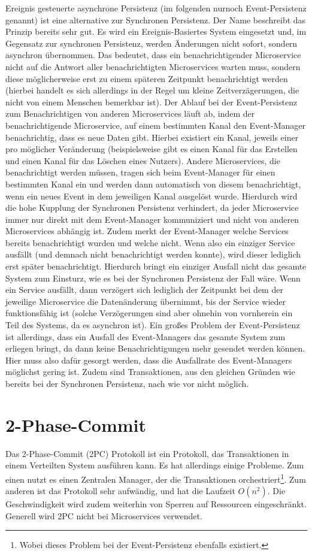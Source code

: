 Ereignis gesteuerte asynchrone Persistenz (im folgenden nurnoch Event-Persistenz genannt) ist eine alternative zur Synchronen Persistenz. Der Name beschreibt das Prinzip bereits sehr gut. Es wird ein Ereignis-Basiertes System eingesetzt und, im Gegensatz zur synchronen Persistenz, werden Änderungen nicht sofort, sondern asynchron übernommen. Das bedeutet, dass ein benachrichtigender Microservice nicht auf die Antwort aller benachrichtigten Microservices warten muss, sondern diese möglicherweise erst zu einem späteren Zeitpunkt benachrichtigt werden (hierbei handelt es sich allerdings in der Regel um kleine Zeitverzägerungen, die nicht von einem Menschen bemerkbar ist).
Der Ablauf bei der Event-Persistenz zum Benachrichtigen von anderen Microservices läuft ab, indem der benachrichtigende Microservice, auf einem bestimmten Kanal den Event-Manager benachrichtig, dass es neue Daten gibt. Hierbei existiert ein Kanal, jeweils einer pro möglicher Veränderung (beispielsweise gibt es einen Kanal für das Erstellen und einen Kanal für das Löschen eines Nutzers). Andere Microservices, die benachrichtigt werden müssen, tragen sich beim Event-Manager für einen bestimmten Kanal ein und werden dann automatisch von diesem benachrichtigt, wenn ein neues Event in dem jeweiligen Kanal ausgelöst wurde.
Hierdurch wird die hohe Kupplung der Synchronen Persistenz verhindert, da jeder Microservice immer nur direkt mit dem Event-Manager kommuniziert und nicht von anderen Microservices abhängig ist. Zudem merkt der Event-Manager welche Services bereits benachrichtigt wurden und welche nicht. Wenn also ein einziger Service ausfällt (und demnach nicht benachrichtigt werden konnte), wird dieser lediglich erst später benachrichtigt. Hierdurch bringt ein einziger Ausfall nicht das gesamte System zum Einsturz, wie es bei der Synchronen Persistenz der Fall wäre. Wenn ein Service ausfällt, dann verzögert sich lediglich der Zeitpunkt bei dem der jeweilige Microservice die Datenänderung übernimmt, bis der Service wieder funktionsfähig ist (solche Verzögerungen sind aber ohnehin von vornherein ein Teil des Systems, da es asynchron ist).
Ein großes Problem der Event-Persistenz ist allerdings, dass ein Ausfall des Event-Managers das gesamte System zum erliegen bringt, da dann keine Benachrichtigungen mehr gesendet werden können. Hier muss also dafür gesorgt werden, dass die Ausfallrate des Event-Managers möglichst gering ist. 
Zudem sind Transaktionen, aus den gleichen Gründen wie bereits bei der Synchronen Persistenz, nach wie vor nicht möglich.

\section{2-Phase-Commit}
Das 2-Phase-Commit (2PC) Protokoll ist ein Protokoll, das Transaktionen in einem Verteilten System ausführen kann. Es hat allerdings einige Probleme. Zum einen nutzt es einen Zentralen Manager, der die Transaktionen orchestriert\footnote{Wobei dieses Problem bei der Event-Persistenz ebenfalls existiert.}. Zum anderen ist das Protokoll sehr aufwändig, und hat die Laufzeit $O(n^2)$. Die Geschwindigkeit wird zudem weiterhin von Sperren auf Ressourcen eingeschränkt. Generell wird 2PC nicht bei Microservices verwendet.

